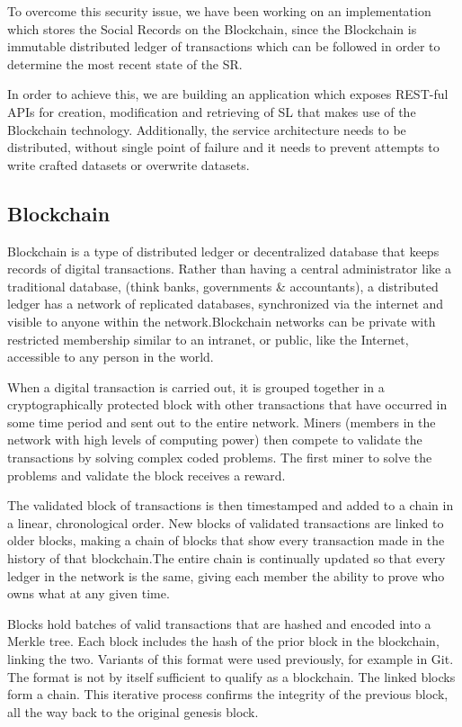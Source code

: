 To overcome this security issue, we have been working on an implementation which stores the Social Records on the Blockchain, since the Blockchain is immutable distributed ledger of transactions which can be followed in order to determine the most recent state of the SR.

In order to achieve this, we are building an application which exposes REST-ful APIs for creation, modification and retrieving of SL that makes use of the Blockchain technology. Additionally, the service architecture needs to be distributed, without single point of failure and it needs to prevent attempts to write crafted datasets or overwrite datasets.



\subsection{Blockchain}
Blockchain is a type of distributed ledger or decentralized database that keeps records of digital transactions. Rather than having a central administrator like a traditional database, (think banks, governments & accountants), a distributed ledger has a network of replicated databases, synchronized via the internet and visible to anyone within the network.Blockchain networks can be private with restricted membership similar to an intranet, or public, like the Internet, accessible to any person in the world.

When a digital transaction is carried out, it is grouped together in a cryptographically protected block with other transactions that have occurred in some time period and sent out to the entire network. Miners (members in the network with high levels of computing power) then compete to validate the transactions by solving complex coded problems. The first miner to solve the problems and validate the block receives a reward.

The validated block of transactions is then timestamped and added to a chain in a linear, chronological order. New blocks of validated transactions are linked to older blocks, making a chain of blocks that show every transaction made in the history of that blockchain.The entire chain is continually updated so that every ledger in the network is the same, giving each member the ability to prove who owns what at any given time.

Blocks hold batches of valid transactions that are hashed and encoded into a Merkle tree. Each block includes the hash of the prior block in the blockchain, linking the two. Variants of this format were used previously, for example in Git. The format is not by itself sufficient to qualify as a blockchain. The linked blocks form a chain. This iterative process confirms the integrity of the previous block, all the way back to the original genesis block.

